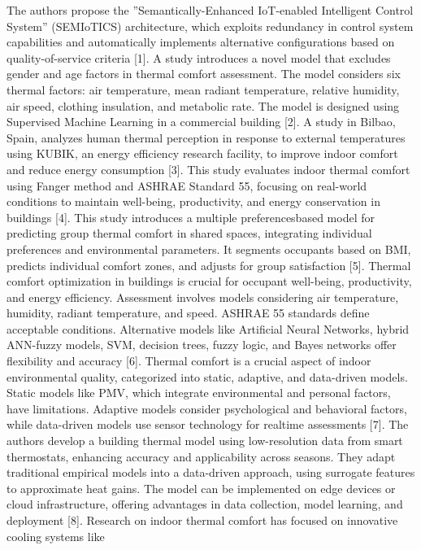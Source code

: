 \begin{multicols}{2}
The authors propose the ''Semantically-Enhanced IoT-enabled Intelligent
Control System'' (SEMIoTICS) architecture, which exploits redundancy in
control system capabilities and automatically implements alternative
configurations based on quality-of-service criteria {[}1{]}. A study
introduces a novel model that excludes gender and age factors in thermal
comfort assessment. The model considers six thermal factors: air
temperature, mean radiant temperature, relative humidity, air speed,
clothing insulation, and metabolic rate. The model is designed using
Supervised Machine Learning in a commercial building {[}2{]}. A study in
Bilbao, Spain, analyzes human thermal perception in response to external
temperatures using KUBIK, an energy efficiency research facility, to
improve indoor comfort and reduce energy consumption {[}3{]}. This study
evaluates indoor thermal comfort using Fanger method and ASHRAE Standard
55, focusing on real-world conditions to maintain well-being,
productivity, and energy conservation in buildings {[}4{]}. This study
introduces a multiple preferencesbased model for predicting group
thermal comfort in shared spaces, integrating individual preferences and
environmental parameters. It segments occupants based on BMI, predicts
individual comfort zones, and adjusts for group satisfaction {[}5{]}.
Thermal comfort optimization in buildings is crucial for occupant
well-being, productivity, and energy efficiency. Assessment involves
models considering air temperature, humidity, radiant temperature, and
speed. ASHRAE 55 standards define acceptable conditions. Alternative
models like Artificial Neural Networks, hybrid ANN-fuzzy models, SVM,
decision trees, fuzzy logic, and Bayes networks offer flexibility and
accuracy {[}6{]}. Thermal comfort is a crucial aspect of indoor
environmental quality, categorized into static, adaptive, and
data-driven models. Static models like PMV, which integrate
environmental and personal factors, have limitations. Adaptive models
consider psychological and behavioral factors, while data-driven models
use sensor technology for realtime assessments {[}7{]}. The authors
develop a building thermal model using low-resolution data from smart
thermostats, enhancing accuracy and applicability across seasons. They
adapt traditional empirical models into a data-driven approach, using
surrogate features to approximate heat gains. The model can be
implemented on edge devices or cloud infrastructure, offering advantages
in data collection, model learning, and deployment {[}8{]}. Research on
indoor thermal comfort has focused on innovative cooling systems like

\end{multicols}
